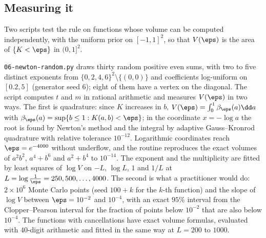 \begin{refsection}
\section{Measuring it}\label{sec:newton:measuring}

Two scripts test the rule on functions whose volume can be computed independently, with the uniform prior on $[-1,1]^2$, so that $V(\eps)$ is the area of $\{K<\eps\}$ in $(0,1]^2$.

\texttt{06-newton-random.py} draws thirty random positive even sums, with two to five distinct exponents from $\{0,2,4,6\}^2\setminus\{(0,0)\}$ and coefficients log-uniform on $[0.2,5]$ (generator seed $6$); eight of them have a vertex on the diagonal. The script computes $t$ and $m$ in rational arithmetic and measures $V(\eps)$ in two ways. The first is quadrature: since $K$ increases in $b$, $V(\eps)=\int_0^1\beta_\eps(a)\dd a$ with $\beta_\eps(a)=\sup\{b\le1:K(a,b)<\eps\}$; in the coordinate $x=-\log a$ the root is found by Newton's method and the integral by adaptive Gauss--Kronrod quadrature with relative tolerance $10^{-12}$. Logarithmic coordinates reach $\eps=e^{-4000}$ without underflow, and the routine reproduces the exact volumes of $a^2b^2$, $a^4+b^6$ and $a^2+b^4$ to $10^{-14}$. The exponent and the multiplicity are fitted by least squares of $\log V$ on $-L$, $\log L$, $1$ and $1/L$ at $L=\log\frac1\eps=250,500,\dots,4000$. The second is what a practitioner would do: $2\times10^6$ Monte Carlo points (seed $100+k$ for the $k$-th function) and the slope of $\log V$ between $\eps=10^{-2}$ and $10^{-4}$, with an exact $95\%$ interval from the Clopper--Pearson interval for the fraction of points below $10^{-2}$ that are also below $10^{-4}$. The functions with cancellations have exact volume formulas, evaluated with $40$-digit arithmetic and fitted in the same way at $L=200$ to $1000$.


\end{refsection}
